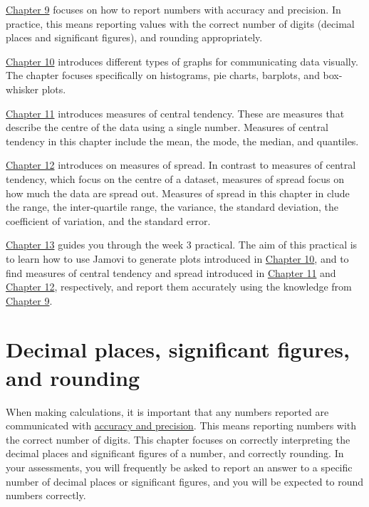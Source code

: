 \documentclass[
]{scrbook}
\begin{document}
\protect\hyperlink{Chapter_9}{Chapter 9} focuses on how to report numbers with accuracy and precision.
In practice, this means reporting values with the correct number of digits (decimal places and significant figures), and rounding appropriately.

\protect\hyperlink{Chapter_10}{Chapter 10} introduces different types of graphs for communicating data visually.
The chapter focuses specifically on histograms, pie charts, barplots, and box-whisker plots.

\protect\hyperlink{Chapter_11}{Chapter 11} introduces measures of central tendency.
These are measures that describe the centre of the data using a single number.
Measures of central tendency in this chapter include the mean, the mode, the median, and quantiles.

\protect\hyperlink{Chapter_12}{Chapter 12} introduces on measures of spread.
In contrast to measures of central tendency, which focus on the centre of a dataset, measures of spread focus on how much the data are spread out.
Measures of spread in this chapter in clude the range, the inter-quartile range, the variance, the standard deviation, the coefficient of variation, and the standard error.

\protect\hyperlink{Chapter_13}{Chapter 13} guides you through the week 3 practical.
The aim of this practical is to learn how to use Jamovi to generate plots introduced in \protect\hyperlink{Chapter_10}{Chapter 10}, and to find measures of central tendency and spread introduced in \protect\hyperlink{Chapter_11}{Chapter 11} and \protect\hyperlink{Chapter_12}{Chapter 12}, respectively, and report them accurately using the knowledge from \protect\hyperlink{Chapter_9}{Chapter 9}.

\hypertarget{Chapter_9}{%
\chapter{Decimal places, significant figures, and rounding}\label{Chapter_9}}

When making calculations, it is important that any numbers reported are communicated with \protect\hyperlink{Chapter_6}{accuracy and precision}.
This means reporting numbers with the correct number of digits.
This chapter focuses on correctly interpreting the decimal places and significant figures of a number, and correctly rounding.
In your assessments, you will frequently be asked to report an answer to a specific number of decimal places or significant figures, and you will be expected to round numbers correctly.
\end{document}

